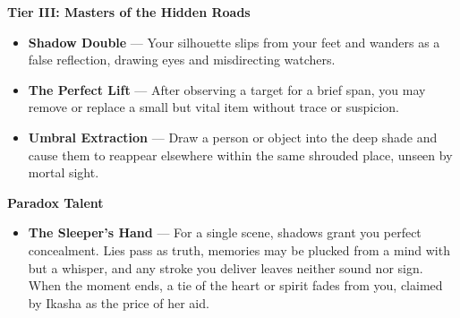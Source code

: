 \documentclass[11pt]{book}
\begin{document}
\begin{tcolorbox}[colback=mistgray!10,colframe=shadowviolet,title={Order of Ikasha --- Talents}]
\begin{itemize}[noitemsep]
\end{itemize}


\textbf{Tier III: Masters of the Hidden Roads}
\begin{itemize}[noitemsep]

  \item \textbf{Shadow Double} --- Your silhouette slips from your feet and wanders as a false reflection, drawing eyes and misdirecting watchers.

  \item \textbf{The Perfect Lift} --- After observing a target for a brief span, you may remove or replace a small but vital item without trace or suspicion.

  \item \textbf{Umbral Extraction} --- Draw a person or object into the deep shade and cause them to reappear elsewhere within the same shrouded place, unseen by mortal sight.

\end{itemize}


\textbf{Paradox Talent}
\begin{itemize}[noitemsep]

  \item \textbf{The Sleeper's Hand} --- For a single scene, shadows grant you perfect concealment. Lies pass as truth, memories may be plucked from a mind with but a whisper, and any stroke you deliver leaves neither sound nor sign. When the moment ends, a tie of the heart or spirit fades from you, claimed by Ikasha as the price of her aid.

\end{itemize}

\end{tcolorbox}

\end{document}

